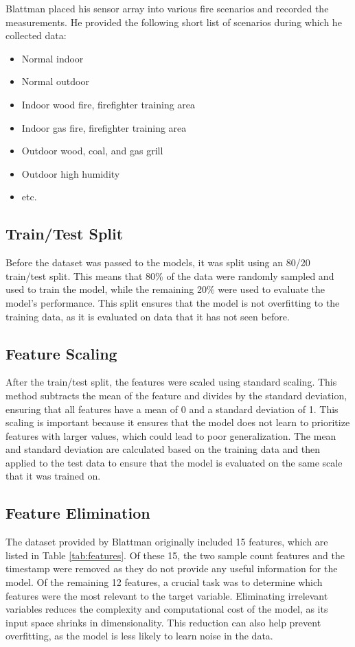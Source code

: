 \documentclass[conference]{IEEEtran}
\begin{document}
Blattman placed his sensor array into various fire scenarios
and recorded the measurements. He provided the following
short list of scenarios during which he collected data:
\begin{itemize}
    \item Normal indoor
    \item Normal outdoor
    \item Indoor wood fire, firefighter training area
    \item Indoor gas fire, firefighter training area
    \item Outdoor wood, coal, and gas grill
    \item Outdoor high humidity
    \item etc.
\end{itemize}
\cite{Blattmann}

\subsection{Train/Test Split}
Before the dataset was passed to the models, it was split
using an 80/20 train/test split. This means that 80\% of the
data were randomly sampled and used to train the model,
while the remaining 20\% were used to evaluate the model's
performance. This split ensures that the model is not
overfitting to the training data, as it is evaluated on data
that it has not seen before.

\subsection{Feature Scaling}
After the train/test split, the features were scaled using
standard scaling. This method subtracts the mean of the
feature and divides by the standard deviation, ensuring that
all features have a mean of 0 and a standard deviation of 1.
This scaling is important because it ensures that the model
does not learn to prioritize features with larger values,
which could lead to poor generalization. The mean and
standard deviation are calculated based on the training data
and then applied to the test data to ensure that the model
is evaluated on the same scale that it was trained on.

\subsection{Feature Elimination}
The dataset provided by Blattman originally included 15
features, which are listed in Table \ref{tab:features}. Of
these 15, the two sample count features and the timestamp
were removed as they do not provide any useful information
for the model. Of the remaining 12 features, a crucial task
was to determine which features were the most relevant to
the target variable. Eliminating irrelevant variables
reduces the complexity and computational cost of the model,
as its input space shrinks in dimensionality. This reduction
can also help prevent overfitting, as the model is less
likely to learn noise in the data.
\end{document}
